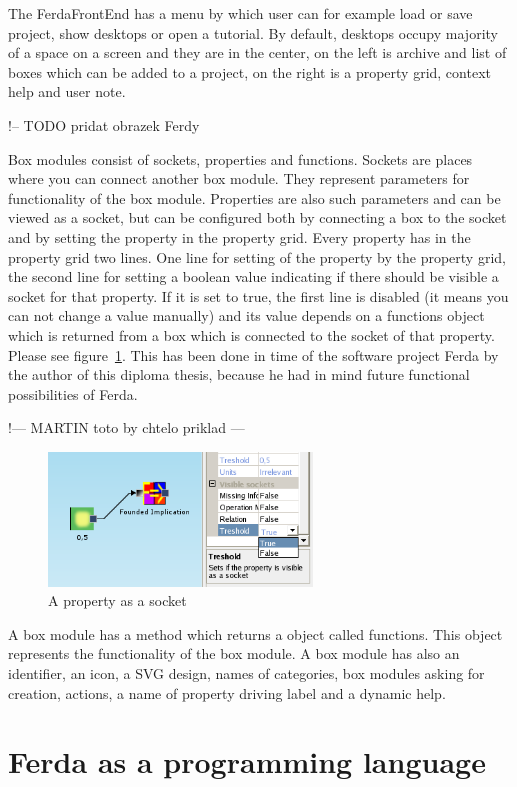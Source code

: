 \documentclass[a4paper,12pt]{book}
\begin{document}
The FerdaFrontEnd has a menu by which user can for example load or save project, show desktops or open a tutorial. By default, desktops occupy majority of a space on a screen and they are in the center, on the left is archive and list of boxes which can be added to a project, on the right is a property grid, context help and user note.

!-- TODO pridat obrazek Ferdy

Box modules consist of sockets, properties and functions. Sockets are places where you can connect another box module. They represent parameters for functionality of the box module. Properties are also such parameters and can be viewed as a socket, but can be configured both by connecting a box to the socket and by setting the property in the property grid. Every property has in the property grid two lines. One line for setting of the property by the property grid, the second line for setting a boolean value indicating if there should be visible a socket for that property. If it is set to true, the first line is disabled (it means you can not change a value manually) and its value depends on a functions object which is returned from a box which is connected to the socket of that property. Please see figure~\ref{fig:propertyAsASocket}. This has been done in time of the software project Ferda by the author of this diploma thesis, because he had in mind future functional possibilities of Ferda. 

!--- MARTIN toto by chtelo priklad ---

\begin{figure}
	\centering
	\includegraphics[width=7cm]{property_as_socket}
	\caption{A property as a socket}
	\label{fig:propertyAsASocket}
\end{figure}

A box module has a method which returns a object called functions. This object represents the functionality of the box module. A box module has also an identifier, an icon, a SVG design, names of categories, box modules asking for creation, actions, a name of property driving label and a dynamic help.

\section{Ferda as a programming language}
\newtheorem{mydef}{Definition}
\end{document}
